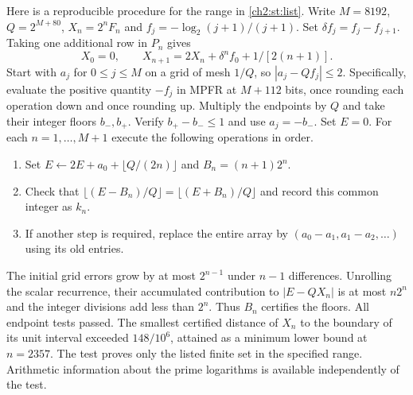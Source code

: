 \documentclass[11pt,a4paper,oneside,openany]{report}
\theoremstyle{remark}\newtheorem{remark}[theorem]{Remark}
\numberwithin{equation}{section}
\begin{document}
Here is a reproducible procedure for the range in \eqref{ch2:st:list}. Write $M=8192$, $Q=2^{M+80}$, $X_n=2^n F_n$ and $f_j=-\log_2(j+1)/(j+1)$. Set $\delta f_j=f_j-f_{j+1}$. Taking one additional row in $P_n$ gives
\[
 X_0=0,\qquad X_{n+1}=2X_n+\delta^n f_0+1/[2(n+1)] .
\]
Start with $a_j$ for $0\le j\le M$ on a grid of mesh $1/Q$, so $|a_j-Q f_j|\le2$. Specifically, evaluate the positive quantity $-f_j$ in MPFR at $M+112$ bits, once rounding each operation down and once rounding up. Multiply the endpoints by $Q$ and take their integer floors $b_-,b_+$. Verify $b_+-b_-\le1$ and use $a_j=-b_-$. Set $E=0$. For each $n=1,\ldots,M+1$ execute the following operations in order.
\begin{enumerate}
\item Set $E\gets2E+a_0+\lfloor Q/(2n)\rfloor$ and $B_n=(n+1)2^n$.
\item Check that $\lfloor(E-B_n)/Q\rfloor=\lfloor(E+B_n)/Q\rfloor$ and record this common integer as $k_n$.
\item If another step is required, replace the entire array by $(a_0-a_1,a_1-a_2,\ldots)$ using its old entries.
\end{enumerate}
The initial grid errors grow by at most $2^{n-1}$ under $n-1$ differences. Unrolling the scalar recurrence, their accumulated contribution to $|E-QX_n|$ is at most $n2^n$ and the integer divisions add less than $2^n$. Thus $B_n$ certifies the floors. All endpoint tests passed. The smallest certified distance of $X_n$ to the boundary of its unit interval exceeded $148/10^6$, attained as a minimum lower bound at $n=2357$. The test proves only the listed finite set in the specified range. Arithmetic information about the prime logarithms is available independently of the test.
\end{document}
